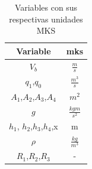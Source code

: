 \documentclass[11pt,letterpaper,spanish,notitlepage]{report}
\begin{document}
 
    \begin{table}[h!]
    \centering
    \begin{tabular}{|c|c|}
       \hline
       Variable  & mks \\
         \hline
        $V_{b}$ & $\frac{m}{s}$\\ \hline
        $q_{1}$,$q_{0}$ & $\frac{m^{3}}{s}$ \\ \hline
        $A_{1}$,$A_{2}$,$A_{3}$,$A_{4}$ & $m^2$ \\ \hline 
        $g$&$\frac{kgm}{s^{2}}$\\ \hline
        $h_{1}$, $h_{2}$,$h_{3}$,$h_{4}$,x & m  \\\hline
        $\rho$ & $\frac{kg}{m^{3}}$\\ \hline
         $R_{1}$,$R_{2}$,$R_{3}$ & -\\ \hline 
        
    
    \end{tabular}
    \caption{Variables con sus respectivas unidades MKS}
    \label{tab:my_label}
\end{table}
  
\end{document}
